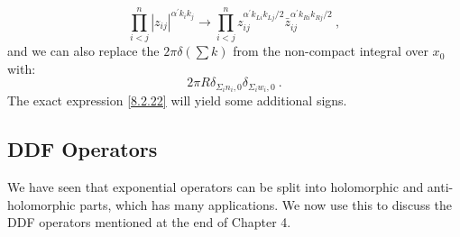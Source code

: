 \begin{equation}
	\prod_{i<j}^{n}|z_{i j}|^{\alpha^{\prime} k_{i} k_{j}} \to \prod_{i<j}^{n} z_{i j}^{\alpha^{\prime} k_{L i} k_{L j} / 2} 
	\bar{z}_{i j}^{\alpha^{\prime} k_{R i} k_{R j} / 2} \:, \label{8.2.24}
\end{equation}
and we can also replace the $2 \pi \delta(\sum k)$ from the non-compact integral over $x_{0}$ with:
\begin{equation}
	2 \pi R \delta_{\Sigma_{i} n_{i}, 0} \delta_{\Sigma_{i} w_{i}, 0} \:. \label{8.2.25}
\end{equation}
The exact expression \eqref{8.2.22} will yield some additional signs.

\subsection*{DDF Operators}

We have seen that exponential operators can be split into holomorphic and anti-holomorphic parts, which has many applications. We now use this to discuss the DDF operators mentioned at the end of Chapter 4.

